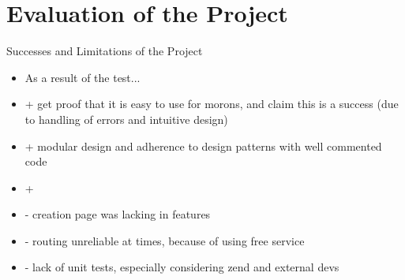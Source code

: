 \section{Evaluation of the Project}

{\color{red}
	Successes and Limitations of the Project
	\begin{itemize}
		\item As a result of the test...
		\item + get proof that it is easy to use for morons, and claim this is a success (due to handling of errors and intuitive design)
		\item + modular design and adherence to design patterns with well commented code
		\item + 
		\item - creation page was lacking in features
		\item - routing unreliable at times, because of using free service
		\item - lack of unit tests, especially considering zend and external devs
	\end{itemize}
}

